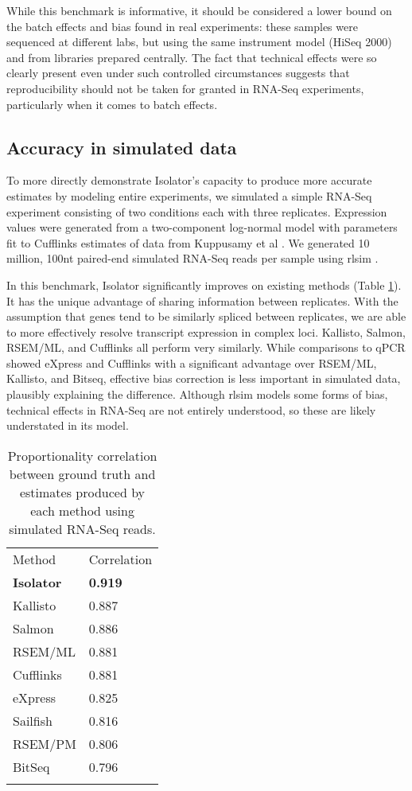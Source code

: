 \documentclass[twocolumn]{article}
\begin{document}
While this benchmark is informative, it should be considered a lower bound on
the batch effects and bias found in real experiments: these samples were
sequenced at different labs, but using the same instrument model (HiSeq 2000)
and from libraries prepared centrally. The fact that technical effects were so
clearly present even under such controlled circumstances suggests that
reproducibility should not be taken for granted in RNA-Seq experiments,
particularly when it comes to batch effects.

\subsection{Accuracy in simulated data}\label{accuracy-in-simulated-data}

To more directly demonstrate Isolator's capacity to produce more accurate
estimates by modeling entire experiments, we simulated a simple RNA-Seq
experiment consisting of two conditions each with three replicates. Expression
values were generated from a two-component log-normal model with parameters fit
to Cufflinks estimates of data from Kuppusamy et al \cite{Kuppusamy:2015ey}. We
generated 10 million, 100nt paired-end simulated RNA-Seq reads per sample using
rlsim \cite{Sipos:2013tz}.

In this benchmark, Isolator significantly improves on existing methods (Table
\ref{table:rlsim}). It has the unique advantage of sharing information between
replicates. With the assumption that genes tend to be similarly spliced between
replicates, we are able to more effectively resolve transcript expression in
complex loci. Kallisto, Salmon, RSEM/ML, and Cufflinks all perform very
similarly. While comparisons to qPCR showed eXpress and Cufflinks with a
significant advantage over RSEM/ML, Kallisto, and Bitseq, effective bias
correction is less important in simulated data, plausibly explaining the
difference. Although rlsim models some forms of bias, technical effects in
RNA-Seq are not entirely understood, so these are likely understated in its
model.

\begin{table}
\label{table:rlsim}
\begin{tabular}[c]{@{}ll@{}}
\toprule\addlinespace
Method & Correlation
\\\addlinespace
\midrule
\textbf{Isolator} & \textbf{0.919}
\\\addlinespace
Kallisto & 0.887
\\\addlinespace
Salmon & 0.886
\\\addlinespace
RSEM/ML & 0.881
\\\addlinespace
Cufflinks & 0.881
\\\addlinespace
eXpress & 0.825
\\\addlinespace
Sailfish & 0.816
\\\addlinespace
RSEM/PM & 0.806
\\\addlinespace
BitSeq & 0.796
\\\addlinespace
\bottomrule
\addlinespace
\end{tabular}
\caption{
Proportionality correlation between ground truth and estimates
produced by each method using simulated RNA-Seq reads.}
\end{table}
\end{document}
